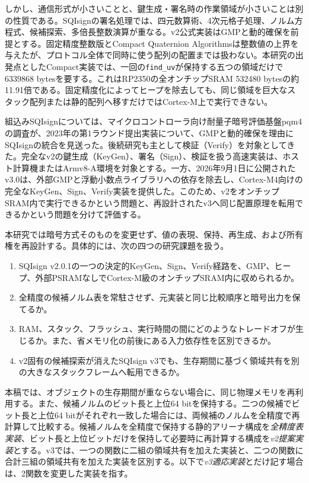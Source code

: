 \documentclass[a4paper,10pt]{ltjsarticle}
\theoremstyle{definition}
\theoremstyle{remark}
\begin{document}
しかし、通信形式が小さいことと、鍵生成・署名時の作業領域が小さいことは別の性質である。SQIsignの署名処理では、四元数算術、4次元格子処理、ノルム方程式、候補探索、多倍長整数演算が重なる。v2公式実装はGMPと動的確保を前提とする。固定精度整数版\cite{fixed-precision-2025}とCompact Quaternion Algorithms\cite{compact-quaternion-2026}は整数値の上界を与えたが、プロトコル全体で同時に使う配列の配置までは扱わない。本研究の出発点としたCompact実装では、一回の\texttt{find\_uv}が保持する五つの領域だけで\num{6339868} bytesを要する。これはRP2350の全オンチップSRAM \num{532480} bytesの約\num{11.91}倍である。固定精度化によってヒープを除去しても、同じ領域を巨大なスタック配列または静的配列へ移すだけではCortex-M上で実行できない。

組込みSQIsignについては、マイクロコントローラ向け耐量子暗号評価基盤pqm4の調査が、2023年の第1ラウンド提出実装について、GMPと動的確保を理由にSQIsignの統合を見送った\cite{pqm4-2024}。後続研究も主として検証（Verify）を対象としてきた\cite{m4-modarith-2025,sqisign-1d-2024}。完全なv2の鍵生成（KeyGen）、署名（Sign）、検証を扱う高速実装は、ホスト計算機またはArmv8-A環境を対象とする\cite{sqisign-arm-2026}。一方、2026年9月1日に公開されたv3.0は、外部GMPと浮動小数点ライブラリへの依存を除去し、Cortex-M4向けの完全なKeyGen、Sign、Verify実装を提供した\cite{sqisign-spec-v3,sqisign-code-v3}。このため、v2をオンチップSRAM内で実行できるかという問題と、再設計されたv3へ同じ配置原理を転用できるかという問題を分けて評価する。

本研究では暗号方式そのものを変更せず、値の表現、保持、再生成、および所有権を再設計する。具体的には、次の四つの研究課題を扱う。

\begin{enumerate}[label=Q\arabic*.,leftmargin=3em]
  \item SQIsign v2.0.1の一つの決定的KeyGen、Sign、Verify経路を、GMP、ヒープ、外部PSRAMなしでCortex-M級のオンチップSRAM内に収められるか。
  \item 全精度の候補ノルム表を常駐させず、元実装と同じ比較順序と暗号出力を保てるか。
  \item RAM、スタック、フラッシュ、実行時間の間にどのようなトレードオフが生じるか。また、省メモリ化の前後にある入力依存性を区別できるか。
  \item v2固有の候補探索が消えたSQIsign v3でも、生存期間に基づく領域共有を別の大きなスタックフレームへ転用できるか。
\end{enumerate}

本稿では、オブジェクトの生存期間が重ならない場合に、同じ物理メモリを再利用する。また、候補ノルムのビット長と上位64 bitを保持する。二つの候補でビット長と上位64 bitがそれぞれ一致した場合には、両候補のノルムを全精度で再計算して比較する。候補ノルムを全精度で保持する静的アリーナ構成を\emph{全精度表実装}、ビット長と上位ビットだけを保持して必要時に再計算する構成を\emph{v2提案実装}とする。v3では、一つの関数に二組の領域共有を加えた実装と、二つの関数に合計三組の領域共有を加えた実装を区別する。以下で\emph{v3適応実装}とだけ記す場合は、2関数を変更した実装を指す。
\end{document}
